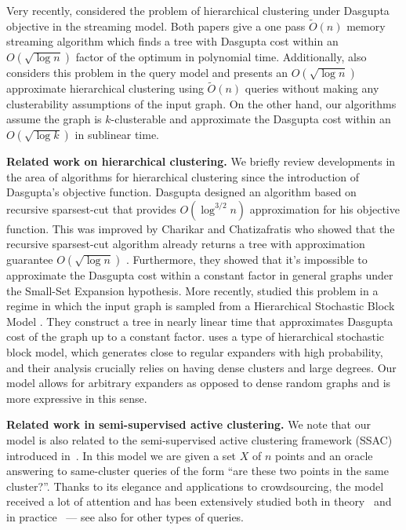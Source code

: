 \documentclass[letterpaper,11pt]{article}
\theoremstyle{plain}
\theoremstyle{definition}
\theoremstyle{remark}
\begin{document}
{Very recently, \cite{AKLP, ACLMW22} considered the problem of hierarchical clustering under Dasgupta 
objective in the streaming model. Both papers give a one pass $\widetilde{O}(n)$ memory streaming 
algorithm which finds a tree with Dasgupta cost within an $O(\sqrt{\log n})$ factor of the optimum 
in polynomial time. Additionally, \cite{AKLP} also considers this problem in the query model 
and presents an $O(\sqrt{\log n})$  approximate hierarchical clustering using $\widetilde{O}(n)$ 
queries without making any clusterability assumptions of the input graph. On the other hand, our 
algorithms assume the graph is $k$-clusterable and approximate the Dasgupta cost within an $O(\sqrt{\log k})$ 
in sublinear time.} 


{\bf Related work on hierarchical clustering.} 
We briefly review developments in the area of algorithms for hierarchical clustering
since the introduction of Dasgupta's objective function.
Dasgupta designed an algorithm based on recursive sparsest-cut that provides $O(\log ^{3/2} n)$ 
approximation for his objective function. This was improved by Charikar and Chatizafratis
who showed that the recursive sparsest-cut algorithm already returns a tree with approximation 
guarantee $O(\sqrt{\log n})$ \cite{charikar2017approximate}. Furthermore, they showed that it's 
impossible to approximate the Dasgupta cost within a constant factor in general graphs under 
the Small-Set Expansion hypothesis.
More recently, \cite{cohen2018hierarchical} studied this problem in a regime in which the input graph is sampled from 
a Hierarchical Stochastic Block Model \cite{cohen2018hierarchical}. They construct a tree in nearly linear time that approximates Dasgupta cost of the graph up to a constant factor. \cite{cohen2018hierarchical}  uses a type of hierarchical stochastic block model, which generates close to regular expanders with high probability, and their analysis crucially relies on having dense clusters and large degrees. Our model allows for arbitrary expanders as opposed to dense random graphs and is more expressive in this sense. 


{\bf Related work in semi-supervised active clustering.}
We note that our model is also related to the semi-supervised active clustering framework (SSAC) introduced in~\cite{AshtianiKB16}. In this model we are given a set $X$ of $n$ points and an oracle answering to same-cluster queries of the form ``are these two points in the same cluster?''. Thanks to its elegance and applications to crowdsourcing, the model received a lot of attention and has been extensively studied both in theory~\cite{ailon2018approximate, ailon2017approximate, BCLP20, BCLP21-density, huleihel2019same, mazumdar2017semisupervised, mazumdar2017clustering, NIPS2017_7054, saha2019correlation, vitale2019flattening} and in practice~\cite{firmani2018robust, gruenheid2015fault, verroios2015entity, verroios2017waldo} --- see also \cite{emamjomeh2018adaptive} for other types of queries. 
\end{document}

